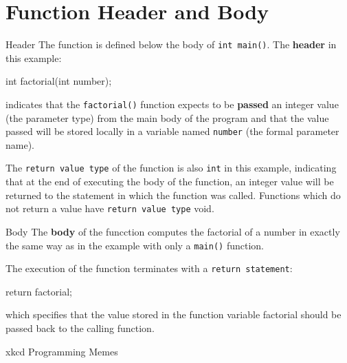 \documentclass[../lecture4-functions.tex]{subfiles}
\begin{document}
\section{Function Header and Body}


\begin{frame}[fragile]{Header}
    The function is defined below the body of \texttt{int main()}. The \textbf{header} in this example:

    \begin{cppcode}[lastline = 1, fontsize=\footnotesize]
int factorial(int number);
    \end{cppcode}

    indicates that the \verb|factorial()| function expects to be \textbf{passed} an integer value (the parameter type) from the main body of the program and that the value passed will be stored locally in a variable named \verb|number| (the formal parameter name). \newline

    The \verb|return value type| of the function is also \verb|int| in this example, indicating that at the end of executing the body of the function, an integer value will be returned to the statement in which the function was called. Functions which do not return a value have \verb|return value type| void.
\end{frame}


\begin{frame}[fragile]{Body}
    The \textbf{body} of the funcction computes the factorial of a number in exactly the same way as in the example with only a \texttt{main()} function. \newline

    The execution of the function terminates with a \verb|return statement|:

    \begin{cppcode}[lastline = 1, fontsize=\footnotesize]
        return factorial;
    \end{cppcode}

    which specifies that the value stored in the function variable factorial should be passed back to the calling function.
\end{frame}


\begin{frame}[fragile]{xkcd Programming Memes}
    \begin{center}
    \end{center}
\end{frame}

\end{document}
